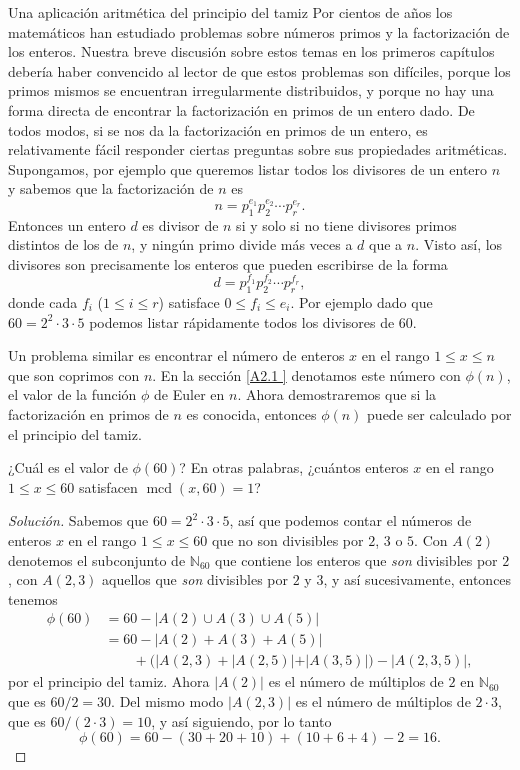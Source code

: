 \begin{section}{Una aplicación aritmética del principio del tamiz}\label{Ap2.2} 
Por cientos de años los matemáticos han estudiado problemas sobre números primos y la fac\-to\-ri\-za\-ción de los enteros. Nuestra breve discusión sobre estos temas en los primeros capítulos debería haber convencido al lector de que estos problemas son difíciles, porque los primos mismos se encuentran irregularmente distribuidos, y porque no hay una forma directa de encontrar la factorización en primos de un entero dado. De todos modos, si se nos da la factorización en primos de un entero, es relativamente fácil responder ciertas preguntas sobre sus propiedades aritméticas. Supongamos, por ejemplo que queremos listar todos los divisores de un entero $n$ y sabemos que la factorización de $n$ es
$$
n=p_1^{e_1}p_2^{e_2}\cdots p_r^{e_r}.
$$
Entonces un entero $d$ es divisor de $n$ si y solo si no tiene divisores primos distintos de los de $n$, y ningún primo divide más veces a $d$ que a $n$. Visto así, los divisores son precisamente los enteros que pueden escribirse de la forma
$$
d=p_1^{f_1}p_2^{f_2}\cdots p_r^{f_r},
$$
donde cada $f_i$ ($1\le i \le r$) satisface $0\le f_i \le e_i$. Por ejemplo dado que $60= 2^2 \cdot 3 \cdot 5$ podemos listar rápidamente todos los divisores de 60.

Un problema similar es encontrar el número de enteros $x$ en el rango $1 \le x \le n$ que son coprimos con $n$. En la sección \ref{A2.1 } denotamos este número con $\phi(n)$, el valor de la función $\phi$ de Euler en $n$. Ahora demostraremos que si la factorización en primos de $n$ es conocida, entonces $\phi(n)$ puede ser calculado por el principio del tamiz.

\begin{ejemplo*}¿Cuál es el valor de $\phi(60)$? En otras palabras, ¿cuántos enteros $x$ en el rango $1 \le x \le 60$ satisfacen $\operatorname{mcd}(x,60)=1$?
\end{ejemplo*}
\begin{proof}[Solución] Sabemos que $60 =2^2 \cdot 3 \cdot 5$, así que podemos contar el números de enteros $x$ en el rango $1 \le x \le 60$ que no son divisibles por $2$, $3$ o $5$. Con $A(2)$ denotemos el subconjunto de $\mathbb N_{60}$ que contiene los enteros que \textit{son} divisibles por $2$, con $A(2,3)$ aquellos que \textit{son} divisibles por $2$ y $3$, y así sucesivamente, entonces tenemos 
$$\begin{aligned}
\phi(60)&=60-|A(2) \cup A(3) \cup A(5)| \\
&= 60-|A(2) + A(3) + A(5)| \\
&\qquad+(|A(2,3) + |A(2,5)| + |A(3,5)|)-|A(2,3,5)|,
\end{aligned}
$$
por el principio del tamiz. Ahora $|A(2)|$ es el número de múltiplos de $2$ en $\mathbb N_{60}$ que es $60 /2 = 30$. Del mismo modo $|A(2,3)|$ es el número de múltiplos de $2 \cdot 3$, que es $60 /(2\cdot 3) = 10$, y así siguiendo, por lo tanto
$$
\phi(60) = 60 -(30+20+10)+(10+6+4)-2=16.
$$
\end{proof}


\end{section}

